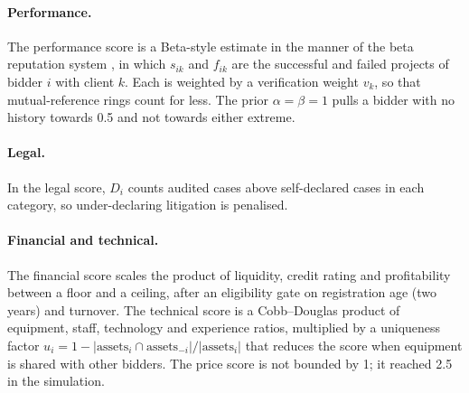 \paragraph{Performance.} The performance score is a Beta-style estimate in the manner of the beta reputation system \cite{josang2002beta}, in which $s_{ik}$ and $f_{ik}$ are the successful and failed projects of bidder $i$ with client $k$. Each is weighted by a verification weight $v_k$, so that mutual-reference rings count for less. The prior $\alpha=\beta=1$ pulls a bidder with no history towards 0.5 and not towards either extreme.

\paragraph{Legal.} In the legal score, $D_i$ counts audited cases above self-declared cases in each category, so under-declaring litigation is penalised.

\paragraph{Financial and technical.} The financial score scales the product of liquidity, credit rating and profitability between a floor and a ceiling, after an eligibility gate on registration age (two years) and turnover. The technical score is a Cobb--Douglas product \cite{cobb1928theory} of equipment, staff, technology and experience ratios, multiplied by a uniqueness factor $u_i=1-|\text{assets}_i\cap\text{assets}_{-i}|/|\text{assets}_i|$ that reduces the score when equipment is shared with other bidders. The price score is not bounded by 1; it reached 2.5 in the simulation.


